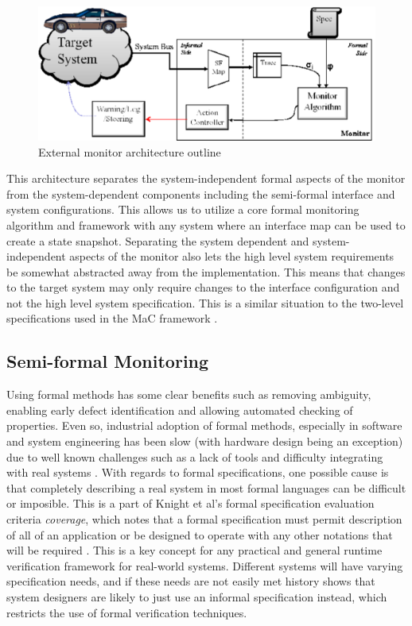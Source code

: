 \documentclass[]{llncs}
\begin{document}
\begin{figure}
\includegraphics[width=4.5in]{img/mon_arch}
\caption{External monitor architecture outline \label{fig:architecture}}
\end{figure}

This architecture separates the system-independent formal aspects of the monitor from the system-dependent components including the semi-formal interface and system configurations. 
This allows us to utilize a core formal monitoring algorithm and framework with any system where an interface map can be used to create a state snapshot. 
Separating the system dependent and system-independent aspects of the monitor also lets the high level system requirements be somewhat abstracted away from the implementation. This means that changes to the target system may only require changes to the interface configuration and not the high level system specification. This is a similar situation to the two-level specifications used in the MaC framework \cite{Kim2004}.

\subsection{Semi-formal Monitoring}
Using formal methods has some clear benefits such as removing ambiguity, enabling early defect identification and allowing automated checking of properties. Even so, industrial adoption of formal methods, especially in software and system engineering has been slow (with hardware design being an exception) due to well known challenges such as a lack of tools and difficulty integrating with real systems \cite{Knight1998}. 
%
With regards to formal specifications, one possible cause is that completely describing a real system in most formal languages can be difficult or imposible. This is a part of Knight et al's formal specification evaluation criteria \emph{coverage}, which notes that a formal specification must permit description of all of an application or be designed to operate with any other notations that will be required \cite{Knight1997a}. 
This is a key concept for any practical and general runtime verification framework for real-world systems. Different systems will have varying specification needs, and if these needs are not easily met history shows that system designers are likely to just use an informal specification instead, which restricts the use of formal verification techniques.
\end{document}
